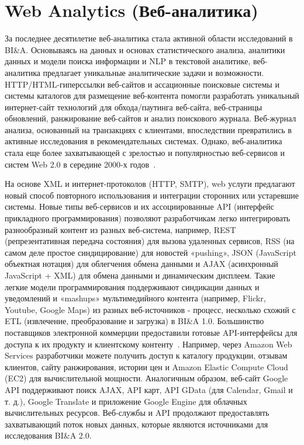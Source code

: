 \section{Web Analytics (Веб-аналитика)}

За последнее десятилетие веб-аналитика стала активной
области исследований в BI\&A. Основываясь на данных
и основах статистического анализа, аналитики данных и
модели поиска информации и NLP в текстовой аналитике,
веб-аналитика предлагает уникальные аналитические задачи и
возможности. HTTP/HTML-гиперссылки веб-сайтов и
ассационные поисковые системы и системы каталогов для
размещение веб-контента помогли разработать уникальный интернет-сайт технологий для обхода/паутинга веб-сайта, веб-страницы обновлений, ранжирование веб-сайтов и анализ поискового журнала. Веб-журнал
анализа, основанный на транзакциях с клиентами, впоследствии
превратились в активные исследования в рекомендательных системах. Однако,
веб-аналитика стала еще более захватывающей с
зрелостью и популярностью веб-сервисов и систем Web 2.0
в середине 2000-х годов~\cite{OReilly:2005}.

На основе XML и интернет-протоколов (HTTP, SMTP), web
услуги предлагают новый способ повторного использования и интеграции сторонних
или устаревшие системы. Новые типы веб-сервисов и их
ассоциированные API (интерфейс прикладного программирования) позволяют
разработчикам легко интегрировать разнообразный контент из разных
веб-система, например, REST (репрезентативная
передача состояния) для вызова удаленных сервисов, RSS (на самом деле
простое синдицирование) для новостей «pushing», JSON (JavaScript
объектная нотация) для облегчения обмена данными и AJAX
(асинхронный JavaScript + XML) для обмена данными и
динамическим дисплеем. Такие легкие модели программирования
поддерживают синдикации данных и уведомлений и «mashups»
мультимедийного контента (например, Flickr, Youtube, Google Maps)
из разных веб-источников - процесс, несколько схожий с
ETL (извлечение, преобразование и загрузка) в BI\&A 1.0.
Большинство поставщиков электронной коммерции предоставили готовые API-интерфейсы
для доступа к их продукту и клиентскому контенту~\cite{Schonfeld:2005}. Например, через Amazon Web Services разработчики
можете получить доступ к каталогу продукции, отзывам клиентов, сайту
ранжирования, истории цен и Amazon Elastic Compute
Cloud (EC2) для вычислительной мощности. Аналогичным образом, веб-сайт Google
API поддерживают поиск AJAX, API карт, API GData (для
Calendar, Gmail и т. д.), Google Translate и приложение Google
Engine для облачных вычислительных ресурсов. Веб-службы и
API продолжают предоставлять захватывающий поток новых данных, которые являются
источниками для исследования BI\&A 2.0.

